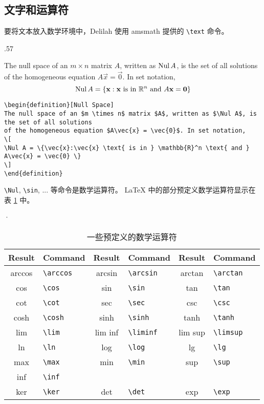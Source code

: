\subsection{文字和运算符}
要将文本放入数学环境中，Delilah 使用 amsmath 提供的 \verb=\text= 命令。
\begin{miniexammar}{.57\textandmarginlen}{
\begin{definition}
The null space of an $m \times n$ matrix $A$, written as $\operatorname{Nul} A$, is the set of all solutions
of the homogeneous equation $A\vec{x} = \vec{0}$. In set notation,
\[
\operatorname{Nul} A = \{\mathbf{x}:\mathbf{x} \text{ is in } \mathbb{R}^n \text{ and } A\mathbf{x} = \mathbf{0} \}
\]
\end{definition}
}
\begin{lstlisting}
\begin{definition}[Null Space]
The null space of an $m \times n$ matrix $A$, written as $\Nul A$, is the set of all solutions
of the homogeneous equation $A\vec{x} = \vec{0}$. In set notation,
\[
\Nul A = \{\vec{x}:\vec{x} \text{ is in } \mathbb{R}^n \text{ and } A\vec{x} = \vec{0} \}
\]
\end{definition}
\end{lstlisting}
\end{miniexammar}

\verb=\Nul=, \verb=\sin=, ... 等命令是数学运算符。 \LaTeX{} 中的部分预定义数学运算符显示在表 \ref{tab:predefmathop} 中。
\begin{table}[hbpt]·
\begin{center}
\small
\begin{tabular}{cl|cl|cl}
Result & Command & Result & Command & Result & Command \\
\hline
arccos & \verb=\arccos= & arcsin & \verb=\arcsin= & arctan & \verb=\arctan= \\
cos & \verb=\cos= & sin & \verb=\sin= & tan & \verb=\tan= \\
cot & \verb=\cot= & sec & \verb=\sec= & csc & \verb=\csc= \\
cosh & \verb=\cosh= & sinh & \verb=\sinh= & tanh & \verb=\tanh= \\
lim & \verb=\lim= & lim inf & \verb=\liminf= & lim sup & \verb=\limsup= \\
ln & \verb=\ln= & log & \verb=\log= & lg & \verb=\lg= \\
max & \verb=\max= & min & \verb=\min= & sup & \verb=\sup= \\
inf & \verb=\inf= &  &  &  &  \\
ker & \verb=\ker= & det & \verb=\det= & exp & \verb=\exp= 
\end{tabular}
\end{center}
\caption{一些预定义的数学运算符}
\label{tab:predefmathop}
\end{table}

